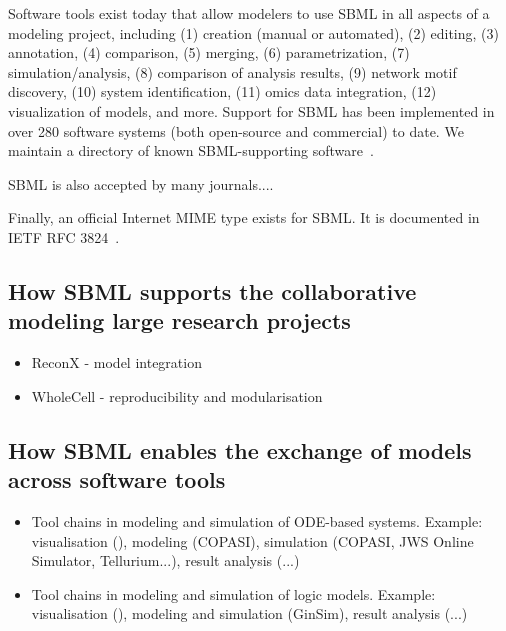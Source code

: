 Software tools exist today that allow modelers to use SBML in all aspects of a modeling project, including (1) creation (manual or automated), (2) editing, (3) annotation, (4) comparison, (5) merging, (6) parametrization, (7) simulation/analysis, (8) comparison of analysis results, (9) network motif discovery, (10) system identification, (11) omics data integration, (12) visualization of models, and more.  Support for SBML has been implemented in over 280 software systems (both open-source and commercial) to date.  We maintain a directory of known SBML-supporting software~\cite{}.

SBML is also accepted by many journals....


Finally, an official Internet MIME type exists for SBML.  It is documented in IETF RFC 3824~\cite{kovitz_2004}.



\subsection{How SBML supports the collaborative modeling large research projects}

\begin{itemize}
\item ReconX - model integration
\item WholeCell - reproducibility and modularisation
\end{itemize}

\subsection{How SBML enables the exchange of models across software tools}
\begin{itemize}
\item Tool chains in modeling and simulation of ODE-based systems. Example: visualisation (), modeling (COPASI), simulation (COPASI, JWS Online Simulator, Tellurium...), result analysis (...)
\item Tool chains in modeling and simulation of logic models. Example: visualisation (), modeling and simulation (GinSim), result analysis (...)
\end{itemize}



